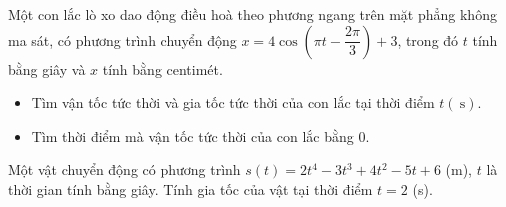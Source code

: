 \begin{bt}%
	Một con lắc lò xo dao động điều hoà theo phương ngang trên mặt phẳng không ma sát, có phương trình chuyển động $x=4 \cos \left(\pi t-\dfrac{2 \pi}{3}\right)+3$, trong đó $t$ tính bằng giây và $x$ tính bằng centimét.
	\begin{itemize}
		\item[a)] Tìm vận tốc tức thời và gia tốc tức thời của con lắc tại thời điểm $t(\mathrm{~s})$.
		\item[b)] Tìm thời điểm mà vận tốc tức thời của con lắc bằng $0$.
	\end{itemize}
\end{bt}

\begin{bt}%
Một vật chuyển động có phương trình $s(t)=2t^4-3t^3+4t^2-5t+6$ (m), $t$ là thời gian tính bằng giây. Tính gia tốc của vật tại thời điểm $t=2$ (s).
\end{bt}

